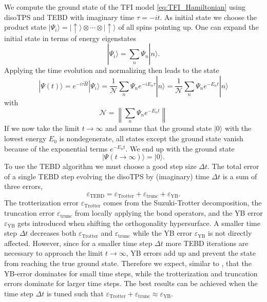 We compute the ground state of the TFI model \eqref{eq:TFI_Hamiltonian} using disoTPS and TEBD with imaginary time $\tau = -i t$. As initial state we choose the product state $|\Psi_i\rangle=|\uparrow\rangle\otimes\cdots\otimes|\uparrow\rangle$ of all spins pointing up. One can expand the initial state in terms of energy eigenstates
\begin{equation}
	|\Psi_i\rangle = \sum_{n} \Psi_n |n\rangle.
\end{equation}
Applying the time evolution and normalizing then leads to the state
\begin{equation}
	|\Psi(t)\rangle = e^{-i\tau\hat{H}} |\Psi_i\rangle = \frac{1}{\mathcal{N}} \sum_{n} \Psi_n e^{-iE_n\tau} |n\rangle = \frac{1}{\mathcal{N}} \sum_{n} \Psi_n e^{-E_nt} |n\rangle
\end{equation}
with
\begin{equation}
	\mathcal{N} = \left\lVert\sum_{n} \Psi_n e^{-E_nt}\right\rVert
\end{equation}
If we now take the limit $t \rightarrow \infty$ and assume that the ground state $|0\rangle$ with the lowest energy $E_0$ is nondegenerate, all states except the ground state vanish because of the exponential terms $e^{-E_nt}$. We end up with the ground state
\begin{equation}
	|\Psi(t\rightarrow\infty)\rangle = |0\rangle.
\end{equation}
To use the TEBD algorithm we must choose a good step size $\Delta t$. The total error of a single TEBD step evolving the disoTPS by (imaginary) time $\Delta t$ is a sum of three errors,
\begin{equation}
	\varepsilon_\text{TEBD} = \varepsilon_\text{Trotter} + \varepsilon_\text{trunc} + \varepsilon_{\text{YB}}.
\end{equation} 
The trotterization error $\varepsilon_\text{Trotter}$ comes from the Suzuki-Trotter decomposition, the truncation error $\varepsilon_\text{trunc}$ from locally applying the bond operators, and the YB error $\varepsilon_{\text{YB}}$ gets introduced when shifting the orthogonality hypersurface. A smaller time step $\Delta t$ decreases both $\varepsilon_\text{Trotter}$ and $\varepsilon_\text{trunc}$ while the YB error $\varepsilon_{\text{YB}}$ is not directly affected. However, since for a smaller time step $\Delta t$ more TEBD iterations are necessary to approach the limit $t\rightarrow\infty$, YB errors add up and prevent the state from reaching the true ground state. Therefore we expect, similar to \cite{cite:isometric_tensor_network_states_in_two_dimensions, cite:efficient_simulation_of_dynamics_in_two_dimensional_quantum_spin_systems}, that the YB-error dominates for small time steps, while the trotterization and truncation errors dominate for larger time steps. The best results can be achieved when the time step $\Delta t$ is tuned such that $\varepsilon_\text{Trotter} + \varepsilon_\text{trunc} \approx \varepsilon_{\text{YB}}$. \par
